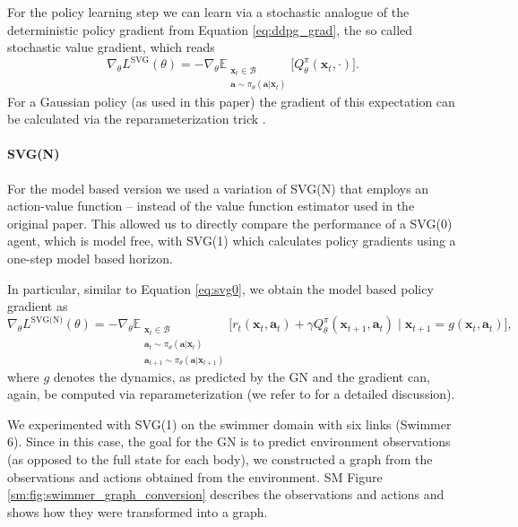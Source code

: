 For the policy learning step we can learn via a stochastic analogue of the deterministic policy gradient from Equation \eqref{eq:ddpg_grad}, the so called stochastic value gradient, which reads
\begin{equation}
\nabla_\theta L^{\text{SVG}}(\theta) = - \nabla_\theta \mathbb{E}_{\substack{\mathbf{x}_t \in \mathcal{B} \\ \mathbf{a} \sim \pi_\theta(\mathbf{a} | \mathbf{x}_t)}} \Big[ Q^\pi_\theta(\mathbf{x}_t, \cdot)\Big].
\label{eq:svg0}
\end{equation}
For a Gaussian policy (as used in this paper) the gradient of this expectation can be calculated via the reparameterization trick \citep{Kingma2013auto,rezende14}.


\paragraph{SVG(N)}
For the model based version we used a variation of SVG(N) that employs an action-value function -- instead of the value function estimator used in the original paper. This allowed us to directly compare the performance of a SVG(0) agent, which is model free, with SVG(1) which calculates policy gradients using a one-step model based horizon. 

In particular, similar to Equation \eqref{eq:svg0}, we obtain the model based policy gradient as 
\begin{equation}
\nabla_\theta L^{\text{SVG(N)}}(\theta) = - \nabla_\theta \mathbb{E}_{
\substack{\mathbf{x}_t \in \mathcal{B} \\ 
 \mathbf{a}_t \sim \pi_\theta(\mathbf{a} | \mathbf{x}_t)\\ 
 \mathbf{a}_{t+1} \sim \pi_\theta(\mathbf{a} | \mathbf{x}_{t+1})}} \Big[ r_{t}(\mathbf{x}_t, \mathbf{a}_t) + \gamma Q^\pi_\theta(\mathbf{x}_{t+1}, \mathbf{a}_t) \mid \mathbf{x}_{t+1} = g(\mathbf{x}_t, \mathbf{a}_t) \Big],
\end{equation}
where $g$ denotes the dynamics, as predicted by the GN and the gradient can, again, be computed via reparameterization (we refer to \citet{heess2015learning} for a detailed discussion).

We experimented with SVG(1) on the swimmer domain with six links (Swimmer 6). Since in this case, the goal for the GN is to predict environment observations (as opposed to the full state for each body), we constructed a graph from the observations and actions obtained from the environment.
SM Figure \ref{sm:fig:swimmer_graph_conversion} describes the observations and actions and shows how they were transformed into a graph.


